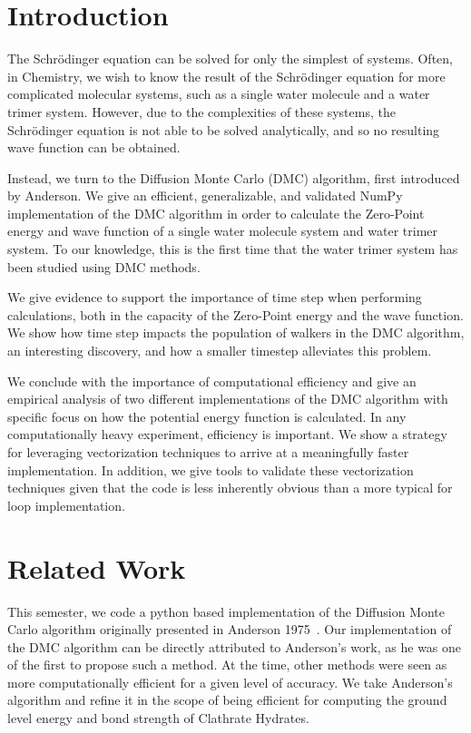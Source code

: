 \documentclass[journal=jacsat,manuscript=article]{achemso}
\begin{document}
\section{Introduction}
The Schr\"odinger equation can be solved for only the simplest of systems. Often, in Chemistry, we wish to know the result of the Schr\"odinger equation for more complicated molecular systems, such as a single water molecule and a water trimer system. However, due to the complexities of these systems, the Schr\"odinger equation is not able to be solved analytically, and so no resulting wave function can be obtained. 

Instead, we turn to the Diffusion Monte Carlo (DMC) algorithm, first introduced by Anderson. We give an efficient, generalizable, and validated NumPy implementation of the DMC algorithm in order to calculate the Zero-Point energy and wave function of a single water molecule system and water trimer system. To our knowledge, this is the first time that the water trimer system has been studied using DMC methods. 

We give evidence to support the importance of time step when performing calculations, both in the capacity of the Zero-Point energy and the wave function. We show how time step impacts the population of walkers in the DMC algorithm, an interesting discovery, and how a smaller timestep alleviates this problem. 

We conclude with the importance of computational efficiency and give an empirical analysis of two different implementations of the DMC algorithm with specific focus on how the potential energy function is calculated. In any computationally heavy experiment, efficiency is important. We show a strategy for leveraging vectorization techniques to arrive at a meaningfully faster implementation. In addition, we give tools to validate these vectorization techniques given that the code is less inherently obvious than a more typical for loop implementation. 

\section{Related Work}

This semester, we code a python based implementation of the Diffusion Monte Carlo algorithm originally presented in Anderson 1975~\cite{Anderson1975}. Our implementation of the DMC algorithm can be directly attributed to Anderson's work, as he was one of the first to propose such a method. At the time, other methods were seen as more computationally efficient for a given level of accuracy. We take Anderson's algorithm and refine it in the scope of being efficient for computing the ground level energy and bond strength of Clathrate Hydrates. 
\end{document}
